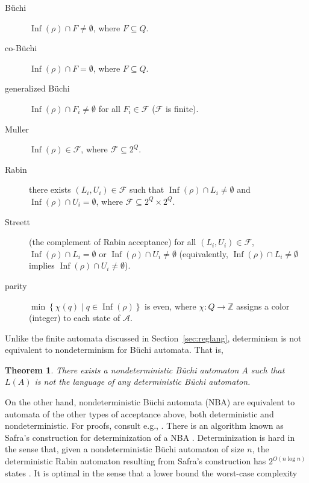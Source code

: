 \documentclass{amsart}
\DeclareMathOperator{\Inf}{Inf}
\theoremstyle{plain}
\newtheorem{thm}{Theorem}
\theoremstyle{definition}
\theoremstyle{definition}
\begin{document}
\begin{description}
\item[B\"uchi] $\Inf(\rho)\cap F \neq\emptyset$, where $F\subseteq Q$.

\item[co-B\"uchi] $\Inf(\rho)\cap F = \emptyset$, where $F\subseteq Q$.

\item[generalized B\"uchi] $\Inf(\rho)\cap F_i \neq\emptyset$ for all $F_i \in \mathcal{F}$ ($\mathcal{F}$ is finite).

\item[Muller] $\Inf(\rho)\in \mathcal{F}$, where $\mathcal{F}\subseteq 2^{Q}$.

\item[Rabin] there exists $(L_i , U_i)\in\mathcal{F}$ such that $\Inf(\rho)\cap L_i \neq \emptyset$ and $\Inf(\rho)\cap U_i = \emptyset$, where $\mathcal{F}\subseteq 2^{Q}\times 2^{Q}$.

\item[Streett] (the complement of Rabin acceptance) for all $(L_i , U_i)\in\mathcal{F}$, $\Inf(\rho)\cap L_i = \emptyset$ or $\Inf(\rho)\cap U_i \neq \emptyset$ (equivalently, $\Inf(\rho)\cap L_i \neq \emptyset$ implies $\Inf(\rho)\cap U_i \neq \emptyset$).

\item[parity] $\min \left\{ \chi(q) \mid q\in \Inf(\rho)\right\} $ is even, where $\chi:Q\rightarrow \mathbb{Z}$ assigns a color (integer) to each state of $\mathcal{A}$.
\end{description}

Unlike the finite automata discussed in Section~\ref{sec:reglang}, determinism
is not equivalent to nondeterminism for B\"uchi automata.  That is,
\begin{thm}
There exists a nondeterministic B\"uchi automaton $A$ such that $L(A)$ is not
the language of any deterministic B\"uchi automaton.
\end{thm}
On the other hand, nondeterministic B\"uchi automata (NBA) are equivalent to
automata of the other types of acceptance above, both deterministic and
nondeterministic.  For proofs, consult e.g., \cite{Gradel2002}.  There is an
algorithm known as Safra's construction for determinization of a NBA
\cite{Safra1988}.  Determinization is hard in the sense that, given a
nondeterministic B\"uchi automaton of size $n$, the deterministic Rabin
automaton resulting from Safra's construction has $2^{O(n\log n)}$ states
\cite{Safra1988}.  It is optimal in the sense that a lower bound the worst-case complexity 
\end{document}
